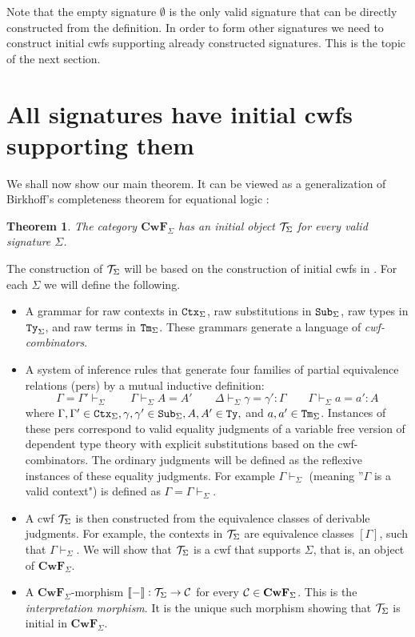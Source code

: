 \documentclass{lmcs}
\newtheorem{theorem}{Theorem}
\def\Cwf{\mathbf{CwF}}
\begin{document}
Note that the empty signature $\emptyset$ is the only valid signature that can be directly constructed from the definition. In order to form other signatures we need to construct initial cwfs supporting already constructed signatures. This is the topic of the next section.

\section{All signatures have initial cwfs supporting them}

We shall now show our main theorem. It can be viewed as a generalization of Birkhoff's completeness theorem for equational logic \cite{birkhoff}:
\begin{theorem}
The category $\Cwf_\Sigma$ has an initial object ${\mathcal T}_\Sigma$ for every valid signature $\Sigma$.
\end{theorem}

The construction of ${\mathcal T}_\Sigma$ will be based on the construction of initial cwfs in \cite{castellan:tlca2015,castellan:lmcs}. For each $\Sigma$ we will define the following.
\begin{itemize}
\item 
A grammar for raw contexts in ${\tt Ctx}_\Sigma$, raw substitutions in ${\tt Sub}_\Sigma$, raw types in ${\tt Ty}_\Sigma$, and raw terms in ${\tt Tm}_\Sigma$. These grammars generate a language of {\em cwf-combinators}.
\item
A system of inference rules that generate four families of partial equivalence relations (pers) by a mutual inductive definition:
$$
\Gamma = \Gamma' \vdash_\Sigma
\qquad
\Gamma \vdash_\Sigma A = A' 
\qquad
\Delta \vdash_\Sigma \gamma = \gamma' : \Gamma
\qquad
\Gamma \vdash_\Sigma a = a' : A
$$
where $\Gamma, \Gamma' \in {\tt Ctx}_\Sigma, \gamma, \gamma' \in {\tt Sub}_\Sigma, A, A' \in {\tt Ty},$ and $a,a' \in {\tt Tm}_\Sigma$. Instances of these pers correspond to valid equality judgments of a variable free version of dependent type theory with explicit substitutions based on the cwf-combinators. The ordinary judgments will be defined as the reflexive instances of these equality judgments. For example $\Gamma \vdash_\Sigma$ (meaning ”$\Gamma$ is a valid context") is defined as $\Gamma = \Gamma \vdash_\Sigma$.
\item
A cwf ${\mathcal T}_\Sigma$ is then constructed from the equivalence classes of derivable judgments. For example, the contexts in ${\mathcal T}_\Sigma$ are equivalence classes $[\Gamma]$, such that $\Gamma \vdash_\Sigma$. We will show that ${\mathcal T}_\Sigma$ is a cwf that supports $\Sigma$, that is, an object of $\Cwf_\Sigma$.
\item
A $\Cwf_\Sigma$-morphism $\llbracket - \rrbracket : {\mathcal T}_\Sigma \to {\mathcal C}$ for every $\C \in \Cwf_\Sigma$. This is the {\em interpretation morphism}. It is the unique such morphism showing that ${\mathcal T}_\Sigma$ is initial in $\Cwf_\Sigma$.
 \end{itemize}
 
\end{document}
